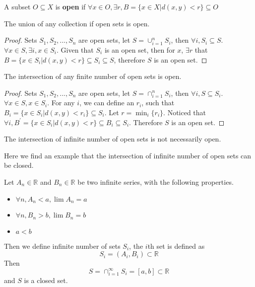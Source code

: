 			\begin{definition}
				A subset $O \subseteq X$ is \textbf{open} if $\forall x \in O, \exists r, B=\{x\in X|d(x, y) < r\} \subseteq O$
			\end{definition}

			\begin{theorem}
				The union of any collection if open sets is open.
			\end{theorem}

			\begin{proof}
				Sets $S_1, S_2, ..., S_n$ are open sets, let $S = \cup_{i=1}^n S_i$, then $\forall i, S_i \subseteq S$. $\forall x\in S, \exists i, x\in S_i$. Given that $S_i$ is an open set, then for $x$, $\exists r$ that $B = \{x \in S_i | d(x, y) < r\} \subseteq S_i \subseteq S$, therefore $S$ is an open set.
			\end{proof}

			\begin{theorem}
				The intersection of any finite number of open sets is open.
			\end{theorem}

			\begin{proof}
				Sets $S_1, S_2, ..., S_n$ are open sets, let $S = \cap_{i=1}^n S_i$, then $\forall i, S \subseteq S_i$. $\forall x\in S, x\in S_i$. For any $i$, we can define an $r_i$, such that $B_i = \{x\in S_i|d(x, y) < r_i\} \subseteq S_i$. Let $r = \min_i\{r_i\}$. Noticed that $\forall i, B^\prime = \{x \in S_i|d(x, y) < r\} \subseteq B_i \subseteq S_i$. Therefore $S$ is an open set.
			\end{proof}

			\begin{remark}
				The intersection of infinite number of open sets is not necessarily open.
			\end{remark}

			Here we find an example that the intersection of infinite number of open sets can be closed.
			\begin{example}
				Let $A_n \in \mathbb{R}$ and $B_n \in \mathbb{R}$ be two infinite series, with the following properties.
				\begin{itemize}
					\item $\forall n, A_n < a, \lim A_n = a$
					\item $\forall n, B_n > b, \lim B_n = b$
					\item $a < b$
				\end{itemize}
				Then we define infinite number of sets $S_i$, the $i$th set is defined as
				\begin{equation}
					S_i = (A_i, B_i) \subset \mathbb{R}
				\end{equation}
				Then
				\begin{equation}
					S = \cap_{i=1}^\infty S_i = [a, b] \subset \mathbb{R}
				\end{equation}
				and $S$ is a closed set.
			\end{example}

